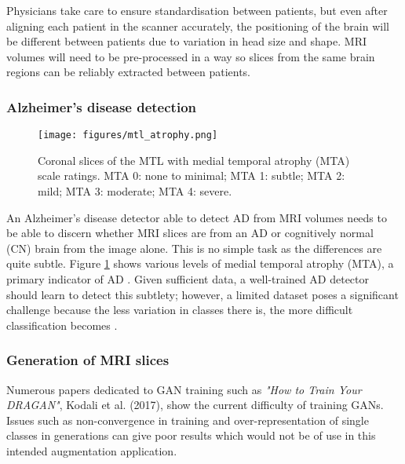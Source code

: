 \documentclass[
    author={Kai Hulme},
    supervisor={Dr Jon Bird},
    degree={BSc},
    title={Generative Adversarial Networks as an Augmentation Technique},
    subtitle={for Alzheimer's Disease Detection in MRI Volumes},
    type={Research},
    year={2021} 
]{dissertation}
\begin{document}
Physicians take care to ensure standardisation between patients, \cite{liu2019comparison} but even after aligning each patient in the scanner accurately, the positioning of the brain will be different between patients due to variation in head size and shape. MRI volumes will need to be pre-processed in a way so slices from the same brain regions can be reliably extracted between patients.

\subsubsection{Alzheimer's disease detection}

\begin{figure}[t]
\centering
\texttt{[image: figures/mtl\_atrophy.png]}
\caption{Coronal slices of the MTL with medial temporal atrophy (MTA) scale ratings. MTA 0: none to minimal; MTA 1: subtle; MTA 2: mild; MTA 3: moderate; MTA 4: severe.}
\label{mtl_atrophy}
\end{figure}

An Alzheimer's disease detector able to detect AD from MRI volumes needs to be able to discern whether MRI slices are from an AD or cognitively normal (CN) brain from the image alone. This is no simple task as the differences are quite subtle. Figure \ref{mtl_atrophy} shows various levels of medial temporal atrophy (MTA), a primary indicator of AD \cite{tanveer2020machine}. Given sufficient data, a well-trained AD detector should learn to detect this subtlety; however, a limited dataset poses a significant challenge because the less variation in classes there is, the more difficult classification becomes \cite{cho2015much} .

\subsubsection{Generation of MRI slices}

Numerous papers dedicated to GAN training such as \textit{"How to Train Your DRAGAN"}, Kodali et al. (2017), \cite{kodali2017train} show the current difficulty of training GANs. Issues such as non-convergence in training and over-representation of single classes in generations can give poor results which would not be of use in this intended augmentation application. 
\\
\end{document}

